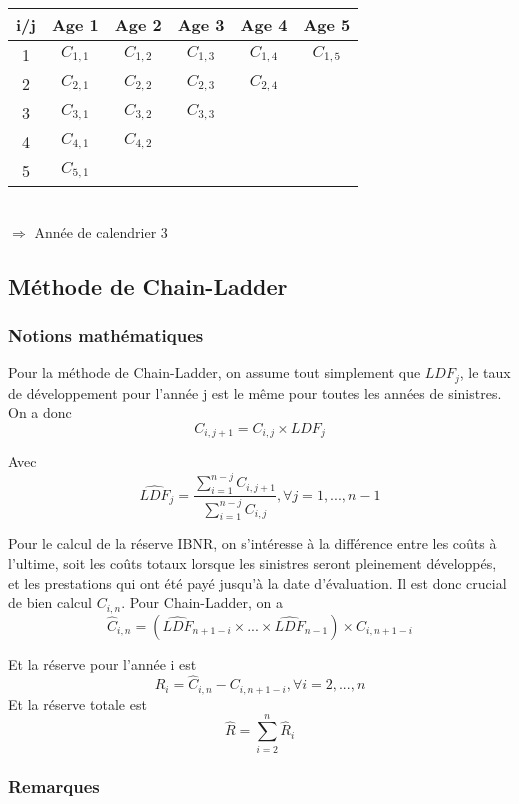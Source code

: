 \documentclass[11pt,french]{report}
\begin{document}
\begin{tabular}{|c|c|c|c|c|c|}
  \hline
   i/j & Age 1 & Age 2 & Age 3 & Age 4 & Age 5 \\
  \hline
1 & $C_{1,1}$ & $C_{1,2}$ & \color{red} $C_{1,3}$ & $C_{1,4}$ & $C_{1,5}$ \\
2 & $C_{2,1}$ & \color{red} $C_{2,2}$ & $C_{2,3}$ & $C_{2,4}$ & \\
3 & \color{red} $C_{3,1}$ & $C_{3,2}$ & $C_{3,3}$ &  & \\
4 & $C_{4,1}$ & $C_{4,2}$ &  &  & \\
5 & $C_{5,1}$ &  &  &  & \\
  \hline
\end{tabular}\\


$\Rightarrow$ \color{red} Année de calendrier 3 \color{black}

\subsection*{Méthode de Chain-Ladder}

\subsubsection*{Notions mathématiques}

Pour la méthode de Chain-Ladder, on assume tout simplement que $LDF_j$, le taux de développement pour l'année j est le même pour toutes les années de sinistres. On a donc
$$C_{i,j+1} = C_{i,j} \times LDF_j$$

Avec
$$\widehat{LDF}_j = \frac{\sum_{i=1}^{n-j} C_{i,j+1}}{\sum_{i=1}^{n-j} C_{i,j}}, \forall j=1,...,n-1$$

Pour le calcul de la réserve IBNR, on s'intéresse à la différence entre les coûts à l'ultime, soit les coûts totaux lorsque les sinistres seront pleinement développés, et les prestations qui ont été payé jusqu'à la date d'évaluation. Il est donc crucial de bien calcul $C_{i,n}$. Pour Chain-Ladder, on a
$$\widehat{C}_{i,n} = (\widehat{LDF}_{n+1-i}\times...\times\widehat{LDF}_{n-1})\times C_{i,n+1-i}$$

Et la réserve pour l'année i est
$$\widehat{R}_i=\widehat{C}_{i,n}-C_{i,n+1-i},\forall i=2,...,n$$
Et la réserve totale est
$$\widehat{R}=\sum_{i=2}^{n} \widehat{R}_i$$

\subsubsection*{Remarques}
\end{document}
